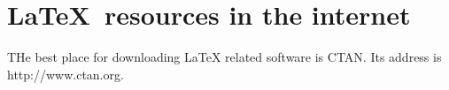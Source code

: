 \documentclass{article}
\begin{document}
\section{\sffamily\LaTeX\ resources in the internet}
THe best place for downloading LaTeX related software is CTAN. Its address is \ttfamily http://www.ctan.org\rmfamily.
\end{document}
